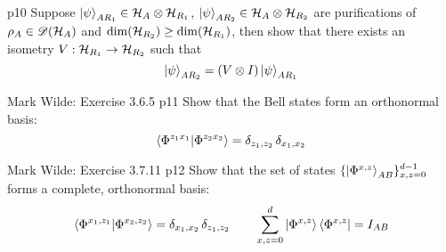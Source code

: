 \documentclass[a4paper, 11pt]{article}
\begin{document}

\begin{problem}{%
	}{p10%
	}
	Suppose $\ket{\psi}_{AR_1}\in \mathcal{H}_{A}\otimes \mathcal{H}_{R_1}$, $\ket{\psi}_{AR_2}\in \mathcal{H}_A\otimes \mathcal{H}_{R_2}$ are purifications of  $\rho_A\in {\mathscr{D}}(\mathcal{H}_A)$ and $\dim(\mathcal{H}_{R_2})\geq \dim(\mathcal{H}_{R_1})$, then show that  there exists an isometry $V:\mathcal{H}_{R_1}\to \mathcal{H}_{R_2}$  such that $$\ket{\psi}_{AR_2}=(V\otimes I)\ket{\psi}_{AR_1}$$
\end{problem}


\begin{problem}{%
		Mark Wilde: Exercise 3.6.5
	}{p11%
	}
	Show that the Bell states form an orthonormal basis: $$\bra{\Phi^{z_1x_1}}\ket{\Phi^{z_2x_2}}=\delta_{z_1,z_2}\,\delta_{x_1,x_2}$$
\end{problem}


\begin{problem}{%
		Mark Wilde: Exercise 3.7.11
	}{p12%
	}
	 Show that the set of states $\{\ket{\Phi^{x,z}}_{AB}\}^{d-1}_{x,z=0}$ forms a complete, orthonormal basis:$$\bra{\Phi^{x_1,z_1}}\ket{\Phi^{x_2,z_2}}=\delta_{x_1,x_2}\,\delta_{z_1,z_2}\qquad \sum_{x,z=0}^d\ket{\Phi^{x,z}}\bra{\Phi^{x,z}}=I_{AB}$$
\end{problem}
\end{document}
